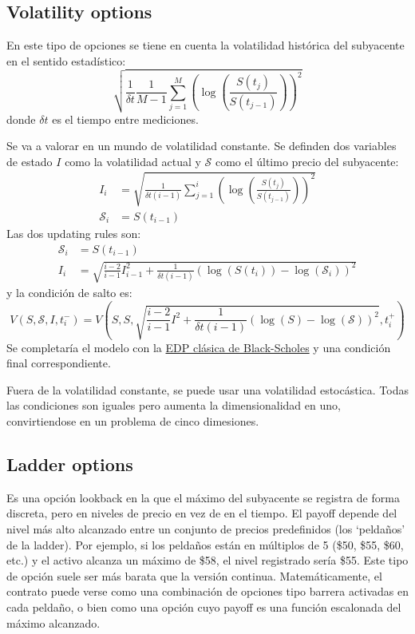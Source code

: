 




\subsection{Volatility options}
En este tipo de opciones se tiene en cuenta la volatilidad histórica del subyacente en el sentido estadístico:
\begin{equation*}
    \sqrt{\frac{1}{\delta t} \frac{1}{M-1} \sum_{j=1}^{M} \left( \log\left( \frac{S(t_j)}{S(t_{j-1})} \right) \right)^2}
\end{equation*}
donde $\delta t$ es el tiempo entre mediciones.

Se va a valorar en un mundo de volatilidad constante. Se definden dos variables de estado $I$ como la volatilidad actual y $\mathcal{S}$ como el último precio del subyacente:
\begin{align*}
    I_i &= \sqrt{ \frac{1}{\delta t (i-1)} \sum_{j=1}^{i} \left( \log\left( \frac{S(t_j)}{S(t_{j-1})} \right) \right)^2 } \\
    \mathcal{S}_i &= S(t_{i-1})
\end{align*}
Las dos updating rules son:
\begin{align*}
    \mathcal{S}_i &= S(t_{i-1}) \\
    I_i &= \sqrt{ \frac{i-2}{i-1} I_{i-1}^2 + \frac{1}{\delta t (i-1)} \left( \log(S(t_i)) - \log(\mathcal{S}_i) \right)^2 }
\end{align*}
y la condición de salto es:
\begin{equation*}
    \boxed{V(S, \mathcal{S}, I, t_i^-) = V\left(S, S, \sqrt{ \frac{i-2}{i-1} I^2 + \frac{1}{\delta t (i-1)} (\log(S) - \log(\mathcal{S}))^2 }, t_i^+\right)}
\end{equation*}
Se completaría el modelo con la \underline{EDP clásica de Black-Scholes} y una condición final correspondiente.

Fuera de la volatilidad constante, se puede usar una volatilidad estocástica. Todas las condiciones son iguales pero aumenta la dimensionalidad en uno, convirtiendose en un problema de cinco dimesiones.







\subsection{Ladder options}
Es una opción lookback en la que el máximo del subyacente se registra de forma discreta, pero en niveles de precio en vez de en el tiempo. El payoff depende del nivel más alto alcanzado entre un conjunto de precios predefinidos (los `peldaños' de la ladder). Por ejemplo, si los peldaños están en múltiplos de 5 (\$50, \$55, \$60, etc.) y el activo alcanza un máximo de \$58, el nivel registrado sería \$55. Este tipo de opción suele ser más barata que la versión continua. Matemáticamente, el contrato puede verse como una combinación de opciones tipo barrera activadas en cada peldaño, o bien como una opción cuyo payoff es una función escalonada del máximo alcanzado.








